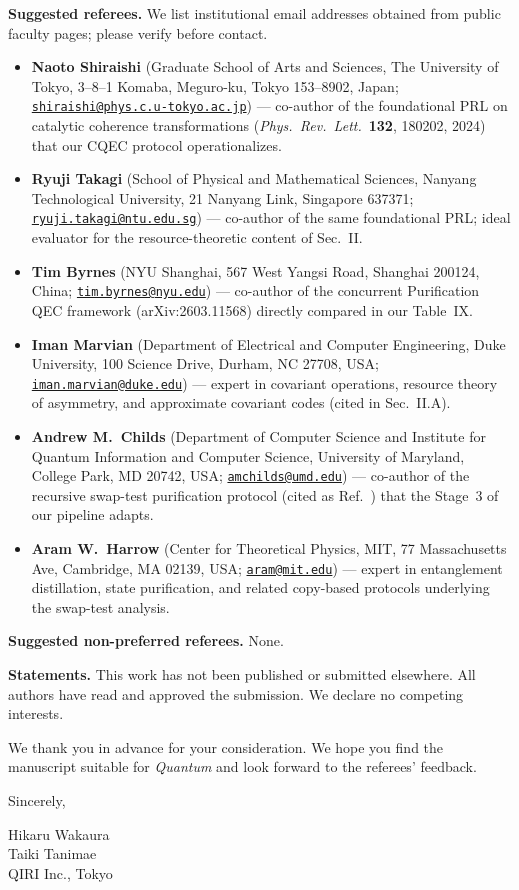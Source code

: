 \documentclass[11pt,a4paper]{article}
\begin{document}
\textbf{Suggested referees.}
We list institutional email addresses obtained from public faculty pages; please verify before contact.
\begin{itemize}
\item \textbf{Naoto Shiraishi} (Graduate School of Arts and Sciences, The University of Tokyo, 3--8--1 Komaba, Meguro-ku, Tokyo 153--8902, Japan; \href{mailto:shiraishi@phys.c.u-tokyo.ac.jp}{\texttt{shiraishi@phys.c.u-tokyo.ac.jp}}) --- co-author of the foundational PRL on catalytic coherence transformations (\emph{Phys.\ Rev.\ Lett.}\ \textbf{132}, 180202, 2024) that our CQEC protocol operationalizes.
\item \textbf{Ryuji Takagi} (School of Physical and Mathematical Sciences, Nanyang Technological University, 21 Nanyang Link, Singapore 637371; \href{mailto:ryuji.takagi@ntu.edu.sg}{\texttt{ryuji.takagi@ntu.edu.sg}}) --- co-author of the same foundational PRL; ideal evaluator for the resource-theoretic content of Sec.~II.
\item \textbf{Tim Byrnes} (NYU Shanghai, 567 West Yangsi Road, Shanghai 200124, China; \href{mailto:tim.byrnes@nyu.edu}{\texttt{tim.byrnes@nyu.edu}}) --- co-author of the concurrent Purification QEC framework (arXiv:2603.11568) directly compared in our Table~IX.
\item \textbf{Iman Marvian} (Department of Electrical and Computer Engineering, Duke University, 100 Science Drive, Durham, NC 27708, USA; \href{mailto:iman.marvian@duke.edu}{\texttt{iman.marvian@duke.edu}}) --- expert in covariant operations, resource theory of asymmetry, and approximate covariant codes (cited in Sec.~II.A).
\item \textbf{Andrew M.~Childs} (Department of Computer Science and Institute for Quantum Information and Computer Science, University of Maryland, College Park, MD 20742, USA; \href{mailto:amchilds@umd.edu}{\texttt{amchilds@umd.edu}}) --- co-author of the recursive swap-test purification protocol (cited as Ref.~\cite{Childs2025}) that the Stage~3 of our pipeline adapts.
\item \textbf{Aram W.~Harrow} (Center for Theoretical Physics, MIT, 77 Massachusetts Ave, Cambridge, MA 02139, USA; \href{mailto:aram@mit.edu}{\texttt{aram@mit.edu}}) --- expert in entanglement distillation, state purification, and related copy-based protocols underlying the swap-test analysis.
\end{itemize}

\textbf{Suggested non-preferred referees.}
None.

\medskip

\textbf{Statements.}
This work has not been published or submitted elsewhere.
All authors have read and approved the submission.
We declare no competing interests.

\medskip

We thank you in advance for your consideration. We hope you find the manuscript suitable for \emph{Quantum} and look forward to the referees' feedback.

\medskip

Sincerely,

\vspace{0.4cm}
Hikaru Wakaura\\
Taiki Tanimae\\
QIRI Inc., Tokyo
\end{document}
